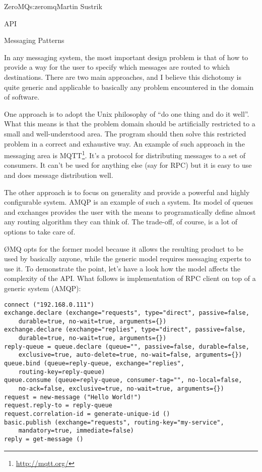 \begin{aosachapter}{ZeroMQ}{s:zeromq}{Martin Sustrik}
\begin{aosasect1}{API}
\end{aosasect1}

\begin{aosasect1}{Messaging Patterns}

In any messaging system, the most important design problem is that of how to
provide a way for the user to specify which messages are routed to
which destinations.  There are two main approaches, and I believe this
dichotomy is quite generic and applicable to basically any problem
encountered in the domain of software.

One approach is to adopt the Unix
philosophy
of ``do one thing and do it well''. What this means is that the problem
domain should be artificially restricted to a small and well-understood 
area. The program should then solve this restricted problem
in a correct and exhaustive way. An example of such approach in
the messaging area is MQTT\footnote{\url{http://mqtt.org/}}. It's a
protocol for distributing messages to a set of consumers. It can't be
used for anything else (say for RPC) but it is easy to use and does
message distribution well.

The other approach is to focus on generality and provide a powerful
and highly configurable system. AMQP is an example of such a
system. Its model of queues and exchanges provides the user with the
means to programatically define almost any routing algorithm they can
think of. The trade-off, of course, is a lot of options to take care
of.

{\O}MQ opts for the former model because it allows the resulting
product to be used by basically anyone, while the generic model
requires messaging experts to use it. To demonstrate the point, let's
have a look how the model affects the complexity of the API. What
follows is implementation of RPC client on top of a generic system
(AMQP):

\begin{verbatim}
connect ("192.168.0.111")
exchange.declare (exchange="requests", type="direct", passive=false,
    durable=true, no-wait=true, arguments={})
exchange.declare (exchange="replies", type="direct", passive=false,
    durable=true, no-wait=true, arguments={})
reply-queue = queue.declare (queue="", passive=false, durable=false,
    exclusive=true, auto-delete=true, no-wait=false, arguments={})
queue.bind (queue=reply-queue, exchange="replies",
    routing-key=reply-queue)
queue.consume (queue=reply-queue, consumer-tag="", no-local=false,
    no-ack=false, exclusive=true, no-wait=true, arguments={})
request = new-message ("Hello World!")
request.reply-to = reply-queue
request.correlation-id = generate-unique-id ()
basic.publish (exchange="requests", routing-key="my-service",
    mandatory=true, immediate=false)
reply = get-message ()
\end{verbatim}


\end{aosasect1}
\end{aosachapter}
